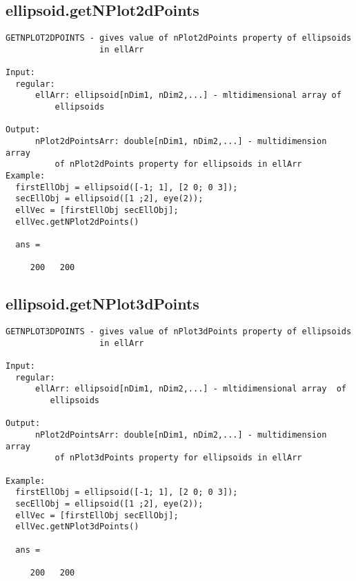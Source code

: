 \subsection{\texorpdfstring{ellipsoid.getNPlot2dPoints}{getNPlot2dPoints}}\label{method:ellipsoid.getNPlot2dPoints}
\begin{verbatim}
GETNPLOT2DPOINTS - gives value of nPlot2dPoints property of ellipsoids
                   in ellArr

Input:
  regular:
      ellArr: ellipsoid[nDim1, nDim2,...] - mltidimensional array of
          ellipsoids

Output:
      nPlot2dPointsArr: double[nDim1, nDim2,...] - multidimension array
          of nPlot2dPoints property for ellipsoids in ellArr
Example:
  firstEllObj = ellipsoid([-1; 1], [2 0; 0 3]);
  secEllObj = ellipsoid([1 ;2], eye(2));
  ellVec = [firstEllObj secEllObj];
  ellVec.getNPlot2dPoints()

  ans =

     200   200
\end{verbatim}
\subsection{\texorpdfstring{ellipsoid.getNPlot3dPoints}{getNPlot3dPoints}}\label{method:ellipsoid.getNPlot3dPoints}
\begin{verbatim}
GETNPLOT3DPOINTS - gives value of nPlot3dPoints property of ellipsoids
                   in ellArr

Input:
  regular:
      ellArr: ellipsoid[nDim1, nDim2,...] - mltidimensional array  of
         ellipsoids

Output:
      nPlot2dPointsArr: double[nDim1, nDim2,...] - multidimension array
          of nPlot3dPoints property for ellipsoids in ellArr

Example:
  firstEllObj = ellipsoid([-1; 1], [2 0; 0 3]);
  secEllObj = ellipsoid([1 ;2], eye(2));
  ellVec = [firstEllObj secEllObj];
  ellVec.getNPlot3dPoints()

  ans =

     200   200
\end{verbatim}
